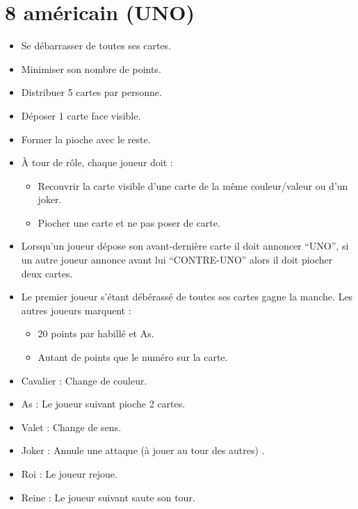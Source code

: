 \newpage

\section{8 américain (UNO)}


\obj
\begin{itemize}
  \item Se débarrasser de toutes ses cartes.
  \item[] {\Large {}\selectfont {OU}}  Minimiser son nombre de points.
\end{itemize}

\ins
\begin{itemize}
  \item Distribuer 5 cartes par personne.
  \item Déposer 1 carte face visible.
  \item Former la pioche avec le reste.
\end{itemize}


\der
\begin{itemize}
  \item À tour de rôle, chaque joueur doit :
    \begin{itemize}
      \item Recouvrir la carte visible d'une carte de la même couleur/valeur ou d'un joker.
      \item Piocher une carte et ne pas poser de carte.
    \end{itemize}
  \item Lorsqu'un joueur dépose son avant-dernière carte il doit annoncer ``UNO'', si un autre joueur annonce avant lui ``CONTRE-UNO'' alors il doit piocher deux cartes.
\end{itemize}

\vic
\begin{itemize}
  \item Le premier joueur s'étant débérassé de toutes ses cartes gagne la manche. Les autres joueurs marquent :
  \begin{itemize}
    \item 20 points par habillé et As.
    \item Autant de points que le numéro sur la carte.
  \end{itemize}
\end{itemize}


\rol
\begin{itemize}
    \item Cavalier : Change de couleur.
    \item As :  Le joueur suivant pioche 2 cartes.
    \item Valet : Change de sens.
    \item Joker : Annule une attaque (à jouer au tour des autres) .
    \item Roi : Le joueur rejoue.
    \item Reine : Le joueur suivant saute son tour.
\end{itemize}

